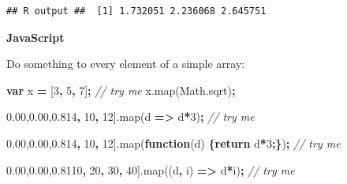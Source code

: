 \documentclass[openany]{book}
\newenvironment{Shaded}{\begin{snugshade}}{\end{snugshade}}
\newcommand{\AttributeTok}[1]{\textcolor[rgb]{0.77,0.63,0.00}{#1}}
\newcommand{\CommentTok}[1]{\textcolor[rgb]{0.56,0.35,0.01}{\textit{#1}}}
\newcommand{\ControlFlowTok}[1]{\textcolor[rgb]{0.13,0.29,0.53}{\textbf{#1}}}
\newcommand{\DecValTok}[1]{\textcolor[rgb]{0.00,0.00,0.81}{#1}}
\newcommand{\KeywordTok}[1]{\textcolor[rgb]{0.13,0.29,0.53}{\textbf{#1}}}
\newcommand{\NormalTok}[1]{#1}
\newcommand{\OperatorTok}[1]{\textcolor[rgb]{0.81,0.36,0.00}{\textbf{#1}}}
\newcommand{\VariableTok}[1]{\textcolor[rgb]{0.00,0.00,0.00}{#1}}
\begin{document}
\begin{verbatim}
## R output ##  [1] 1.732051 2.236068 2.645751
\end{verbatim}

\textbf{JavaScript}

Do something to every element of a simple array:

\begin{Shaded}
\begin{Highlighting}[]
\KeywordTok{var}\NormalTok{ x }\OperatorTok{=}\NormalTok{ [}\DecValTok{3}\OperatorTok{,} \DecValTok{5}\OperatorTok{,} \DecValTok{7}\NormalTok{]}\OperatorTok{;}     \CommentTok{// try me}
\VariableTok{x}\NormalTok{.}\AttributeTok{map}\NormalTok{(}\VariableTok{Math}\NormalTok{.}\AttributeTok{sqrt}\NormalTok{)}\OperatorTok{;}
\end{Highlighting}
\end{Shaded}

\begin{Shaded}
\begin{Highlighting}[]
\NormalTok{[}\DecValTok{4}\OperatorTok{,} \DecValTok{10}\OperatorTok{,} \DecValTok{12}\NormalTok{].}\AttributeTok{map}\NormalTok{(d }\OperatorTok{=>}\NormalTok{ d}\OperatorTok{*}\DecValTok{3}\NormalTok{)}\OperatorTok{;}     \CommentTok{// try me}
\end{Highlighting}
\end{Shaded}

\begin{Shaded}
\begin{Highlighting}[]
\NormalTok{[}\DecValTok{4}\OperatorTok{,} \DecValTok{10}\OperatorTok{,} \DecValTok{12}\NormalTok{].}\AttributeTok{map}\NormalTok{(}\KeywordTok{function}\NormalTok{(d) }\OperatorTok{\{}\ControlFlowTok{return}\NormalTok{ d}\OperatorTok{*}\DecValTok{3}\OperatorTok{;\}}\NormalTok{)}\OperatorTok{;}     \CommentTok{// try me}
\end{Highlighting}
\end{Shaded}

\begin{Shaded}
\begin{Highlighting}[]
\NormalTok{[}\DecValTok{10}\OperatorTok{,} \DecValTok{20}\OperatorTok{,} \DecValTok{30}\OperatorTok{,} \DecValTok{40}\NormalTok{].}\AttributeTok{map}\NormalTok{((d}\OperatorTok{,}\NormalTok{ i) }\OperatorTok{=>}\NormalTok{ d}\OperatorTok{*}\NormalTok{i)}\OperatorTok{;}     \CommentTok{// try me}
\end{Highlighting}
\end{Shaded}
\end{document}
